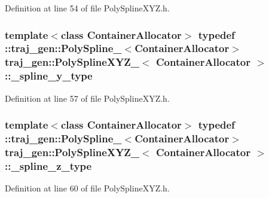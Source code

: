 Definition at line 54 of file Poly\+Spline\+X\+Y\+Z.\+h.

\subsubsection[{\texorpdfstring{\+\_\+spline\+\_\+y\+\_\+type}{_spline_y_type}}]{\setlength{\rightskip}{0pt plus 5cm}template$<$class Container\+Allocator$>$ typedef \+::{\bf traj\+\_\+gen\+::\+Poly\+Spline\+\_\+}$<$Container\+Allocator$>$ {\bf traj\+\_\+gen\+::\+Poly\+Spline\+X\+Y\+Z\+\_\+}$<$ Container\+Allocator $>$\+::{\bf \+\_\+spline\+\_\+y\+\_\+type}}\hypertarget{structtraj__gen_1_1_poly_spline_x_y_z___aa5c2a1e4f6b1c2bef0e83a02a4850186}{}\label{structtraj__gen_1_1_poly_spline_x_y_z___aa5c2a1e4f6b1c2bef0e83a02a4850186}


Definition at line 57 of file Poly\+Spline\+X\+Y\+Z.\+h.

\subsubsection[{\texorpdfstring{\+\_\+spline\+\_\+z\+\_\+type}{_spline_z_type}}]{\setlength{\rightskip}{0pt plus 5cm}template$<$class Container\+Allocator$>$ typedef \+::{\bf traj\+\_\+gen\+::\+Poly\+Spline\+\_\+}$<$Container\+Allocator$>$ {\bf traj\+\_\+gen\+::\+Poly\+Spline\+X\+Y\+Z\+\_\+}$<$ Container\+Allocator $>$\+::{\bf \+\_\+spline\+\_\+z\+\_\+type}}\hypertarget{structtraj__gen_1_1_poly_spline_x_y_z___ae11b69c7c197072da5371f58b07646b4}{}\label{structtraj__gen_1_1_poly_spline_x_y_z___ae11b69c7c197072da5371f58b07646b4}


Definition at line 60 of file Poly\+Spline\+X\+Y\+Z.\+h.

